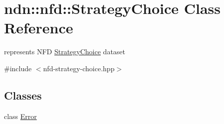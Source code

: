 \hypertarget{classndn_1_1nfd_1_1StrategyChoice}{}\section{ndn\+:\+:nfd\+:\+:Strategy\+Choice Class Reference}
\label{classndn_1_1nfd_1_1StrategyChoice}


represents N\+FD \hyperlink{classndn_1_1nfd_1_1StrategyChoice}{Strategy\+Choice} dataset  




{\ttfamily \#include $<$nfd-\/strategy-\/choice.\+hpp$>$}

\subsection*{Classes}
\begin{DoxyCompactItemize}
\item 
class \hyperlink{classndn_1_1nfd_1_1StrategyChoice_1_1Error}{Error}
\end{DoxyCompactItemize}
